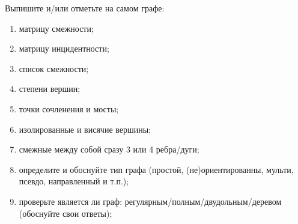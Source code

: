 \question
Выпишите и/или отметьте на самом графе:
\begin{enumerate}
\item   матрицу смежности;
\item   матрицу инцидентности;
\item   список смежности;
\item   степени вершин;
\item   точки сочленения и мосты;
\item   изолированные и висячие вершины;
\item   смежные между собой сразу 3 или 4  ребра/дуги;
\item   определите и обоснуйте тип графа (простой, (не)ориентированны, мульти, псевдо, направленный и т.п.);
\item   проверьте является ли граф: регулярным/полным/двудольным/деревом (обоснуйте свои ответы);
\end{enumerate}
\begin{figure}[h]

\begin{minipage}[h]{0.55\linewidth}
\end{minipage}
\begin{minipage}[h]{0.45\linewidth}
\end{minipage}
\end{figure}
